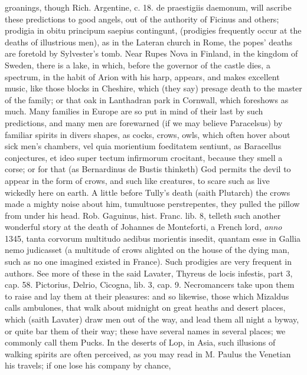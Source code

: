 {groanings, \etc{} though Rich. Argentine, c. 18. de praestigiis
daemonum, will ascribe these predictions to good angels, out of the
authority of Ficinus and others; prodigia in obitu principum saepius
contingunt, \etc{} (prodigies frequently occur at the deaths of
illustrious men), as in the Lateran church in Rome, the popes'
deaths are foretold by Sylvester's tomb. Near Rupes Nova in Finland, in
the kingdom of Sweden, there is a lake, in which, before the governor
of the castle dies, a spectrum, in the habit of Arion with his harp,
appears, and makes excellent music, like those blocks in Cheshire,
which (they say) presage death to the master of the family; or that
oak in Lanthadran park in Cornwall, which foreshows as much. Many
families in Europe are so put in mind of their last by such
predictions, and many men are forewarned (if we may believe Paracelsus)
by familiar spirits in divers shapes, as cocks, crows, owls, which
often hover about sick men's chambers, vel quia morientium foeditatem
sentiunt, as Baracellus conjectures, et ideo super tectum
infirmorum crocitant, because they smell a corse; or for that (as
Bernardinus de Bustis thinketh) God permits the devil to appear
in the form of crows, and such like creatures, to scare such as live
wickedly here on earth. A little before Tully's death (saith Plutarch)
the crows made a mighty noise about him, tumultuose perstrepentes, they
pulled the pillow from under his head. Rob. Gaguinus, hist. Franc. lib.
8, telleth such another wonderful story at the death of Johannes de
Monteforti, a French lord, \emph{anno} 1345, tanta corvorum multitudo
aedibus morientis insedit, quantam esse in Gallia nemo judicasset (a
multitude of crows alighted on the house of the dying man, such as no
one imagined existed in France). Such prodigies are very frequent in
authors. See more of these in the said Lavater, Thyreus de locis
infestis, part 3, cap. 58. Pictorius, Delrio, Cicogna, lib. 3, cap. 9.
Necromancers take upon them to raise and lay them at their pleasures:
and so likewise, those which Mizaldus calls ambulones, that walk about
midnight on great heaths and desert places, which (saith Lavater)
draw men out of the way, and lead them all night a byway, or quite bar
them of their way; these have several names in several places; we
commonly call them Pucks. In the deserts of Lop, in Asia, such
illusions of walking spirits are often perceived, as you may read in M.
Paulus the Venetian his travels; if one lose his company by chance,
}
